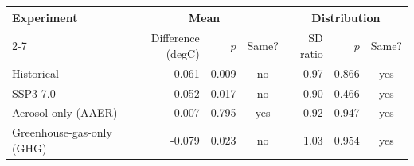 %
%
%
\begin{tabular}{|l|r|r|c|r|r|c|}
\hline
\textbf{Experiment} & \multicolumn{3}{c|}{\textbf{Mean}} & \multicolumn{3}{c|}{\textbf{Distribution}} \\
\cline{2-7}
 & Difference (degC) & $p$ & Same? & SD ratio & $p$ & Same? \\
\hline
Historical & +0.061 & 0.009 & no & 0.97 & 0.866 & yes \\
SSP3-7.0 & +0.052 & 0.017 & no & 0.90 & 0.466 & yes \\
Aerosol-only (AAER) & -0.007 & 0.795 & yes & 0.92 & 0.947 & yes \\
Greenhouse-gas-only (GHG) & -0.079 & 0.023 & no & 1.03 & 0.954 & yes \\
\hline
\end{tabular}
